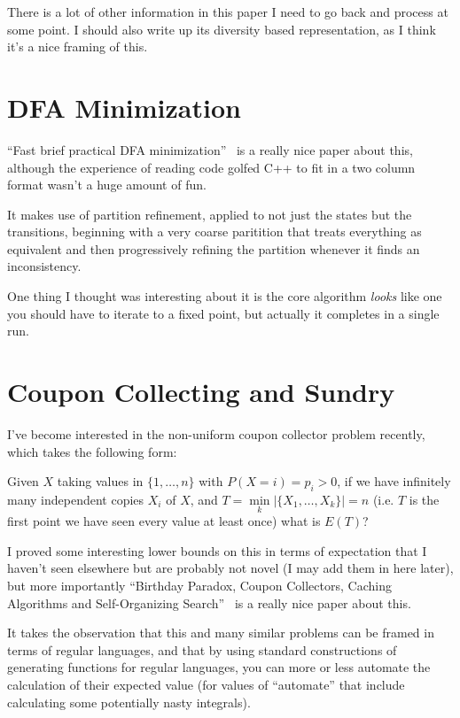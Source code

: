 \documentclass[a4paper]{article}
\begin{document}
There is a lot of other information in this paper I need to go back and process at some point.
I should also write up its diversity based representation,
as I think it's a nice framing of this.

\section{DFA Minimization}

``Fast brief practical DFA minimization''~\cite{DBLP:journals/ipl/Valmari12} is a really nice paper about this,
although the experience of reading code golfed C++ to fit in a two column format wasn't a huge amount of fun.

It makes use of partition refinement,
applied to not just the states but the transitions,
beginning with a very coarse paritition that treats everything as equivalent and then progressively refining the partition whenever it finds an inconsistency.

One thing I thought was interesting about it is the core algorithm \emph{looks} like one you should have to iterate to a fixed point,
but actually it completes in a single run.

\section{Coupon Collecting and Sundry}

I've become interested in the non-uniform coupon collector problem recently,
which takes the following form:

Given \(X\) taking values in \(\{1, \ldots, n\}\) with \(P(X = i) = p_i > 0\),
if we have infinitely many independent copies \(X_i\) of \(X\),
and \(T = \min\limits_k |\{X_1, \ldots, X_k\}| = n\) (i.e. \(T\) is the first point we have seen every value at least once)
what is \(E(T)\)?

I proved some interesting lower bounds on this in terms of expectation that I haven't seen elsewhere but are probably not novel (I may add them in here later),
but more importantly ``Birthday Paradox, Coupon Collectors, Caching Algorithms and Self-Organizing Search''~\cite{DBLP:journals/dam/FlajoletGT92} is a really nice paper about this.

It takes the observation that this and many similar problems can be framed in terms of regular languages,
and that by using standard constructions of generating functions for regular languages,
you can more or less automate the calculation of their expected value (for values of ``automate'' that include calculating some potentially nasty integrals).
\end{document}
